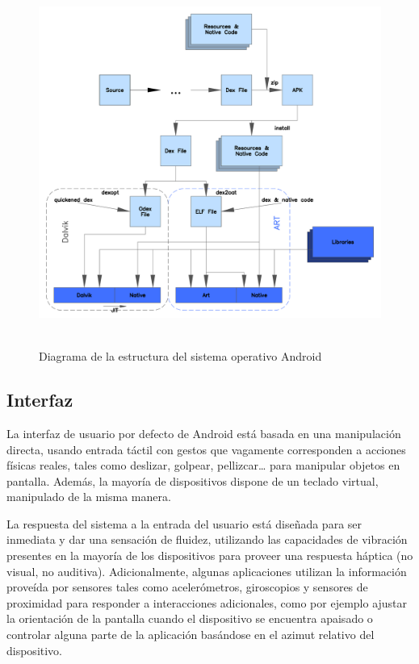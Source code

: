 \begin{figure}[h] \centering
    \includegraphics[height=12cm]{graphs/ART_view.png} \caption{Diagrama de la estructura del sistema operativo Android}\label{fig:diagrama:ART}
\end{figure}

\subsection{Interfaz}

La interfaz de usuario por defecto de Android está basada en una manipulación directa, usando entrada táctil con gestos que vagamente corresponden a acciones físicas reales, tales como deslizar, golpear, pellizcar… para manipular objetos en pantalla. Además, la mayoría de dispositivos dispone de un teclado virtual, manipulado de la misma manera. 

La respuesta del sistema a la entrada del usuario está diseñada para ser inmediata y dar una sensación de fluidez, utilizando las capacidades de vibración presentes en la mayoría de los dispositivos para proveer una respuesta háptica (no visual, no auditiva). Adicionalmente, algunas aplicaciones utilizan la información proveída por sensores tales como acelerómetros, giroscopios y sensores de proximidad para responder a interacciones adicionales, como por ejemplo ajustar la orientación de la pantalla cuando el dispositivo se encuentra apaisado o controlar alguna parte de la aplicación basándose en el azimut relativo del dispositivo.

